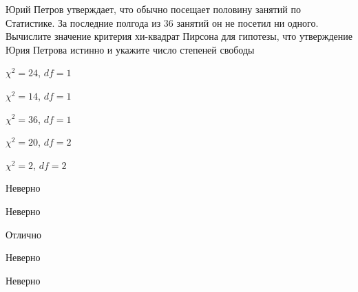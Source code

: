 
\begin{question}
Юрий Петров утверждает, что обычно посещает половину занятий по
Статистике. За последние полгода из 36 занятий он не посетил ни одного.
Вычислите значение критерия хи-квадрат Пирсона для гипотезы, что
утверждение Юрия Петрова истинно и укажите число степеней свободы
\begin{answerlist}
  \item \(\chi^2 = 24\), \(df=1\)
  \item \(\chi^2 = 14\), \(df=1\)
  \item \(\chi^2 = 36\), \(df=1\)
  \item \(\chi^2 = 20\), \(df=2\)
  \item \(\chi^2 = 2\), \(df=2\)
\end{answerlist}
\end{question}

\begin{solution}
\begin{answerlist}
  \item Неверно
  \item Неверно
  \item Отлично
  \item Неверно
  \item Неверно
\end{answerlist}
\end{solution}

